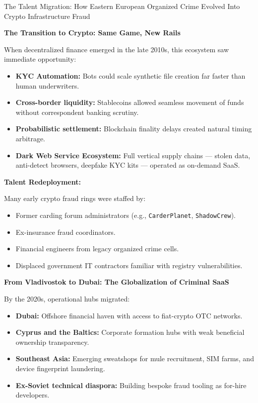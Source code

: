 \begin{HistoricalSidebar}{The Talent Migration: How Eastern European Organized Crime Evolved Into Crypto Infrastructure Fraud}
    \medskip
    
    \textbf{The Transition to Crypto: Same Game, New Rails}
    
    When decentralized finance emerged in the late 2010s, this ecosystem saw immediate opportunity:
    
    \begin{itemize}
        \item \textbf{KYC Automation:} Bots could scale synthetic file creation far faster than human underwriters.
        \item \textbf{Cross-border liquidity:} Stablecoins allowed seamless movement of funds without correspondent banking scrutiny.
        \item \textbf{Probabilistic settlement:} Blockchain finality delays created natural timing arbitrage.
        \item \textbf{Dark Web Service Ecosystem:} Full vertical supply chains — stolen data, anti-detect browsers, deepfake KYC kits — operated as on-demand SaaS.
    \end{itemize}
    
    \medskip
    
    \textbf{Talent Redeployment:}
    
    Many early crypto fraud rings were staffed by:
    
    \begin{itemize}
        \item Former carding forum administrators (e.g., \texttt{CarderPlanet}, \texttt{ShadowCrew}).
        \item Ex-insurance fraud coordinators.
        \item Financial engineers from legacy organized crime cells.
        \item Displaced government IT contractors familiar with registry vulnerabilities.
    \end{itemize}
    
    \medskip
    
    \textbf{From Vladivostok to Dubai: The Globalization of Criminal SaaS}
    
    By the 2020s, operational hubs migrated:
    
    \begin{itemize}
        \item \textbf{Dubai:} Offshore financial haven with access to fiat-crypto OTC networks.
        \item \textbf{Cyprus and the Baltics:} Corporate formation hubs with weak beneficial ownership transparency.
        \item \textbf{Southeast Asia:} Emerging sweatshops for mule recruitment, SIM farms, and device fingerprint laundering.
        \item \textbf{Ex-Soviet technical diaspora:} Building bespoke fraud tooling as for-hire developers.
    \end{itemize}
    

\end{HistoricalSidebar}
